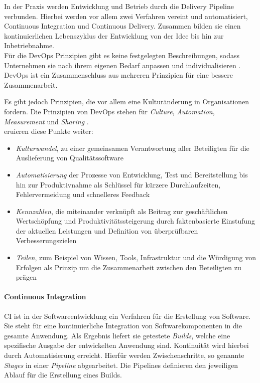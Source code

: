 In der Praxis werden Entwicklung und Betrieb durch die Delivery Pipeline verbunden.
Hierbei werden vor allem zwei Verfahren vereint und automatisiert, Continuous Integration und Continuous Delivery. Zusammen bilden sie einen kontinuierlichen Lebenszyklus der Entwicklung von der Idee bis hin zur Inbetriebnahme.
\medskip
\\
Für die DevOps Prinzipien gibt es keine festgelegten Beschreibungen, sodass Unternehmen sie nach ihrem eigenen Bedarf anpassen und individualisieren \cite{Alt2017}. DevOps ist ein Zusammenschluss aus mehreren Prinzipien für eine bessere Zusammenarbeit.

Es gibt jedoch Prinzipien, die vor allem eine Kulturänderung in Organisationen fordern. Die Prinzipien von DevOps stehen für \emph{Culture}, \emph{Automation}, \emph{Measurement} und \emph{Sharing} \cite{humble:2011}. 
\medskip
\\
\citet[S.26f]{Alt2017} eruieren diese Punkte weiter:
\begin{itemize}
    \item \emph{Kulturwandel}, zu einer gemeinsamen Verantwortung aller Beteiligten für die Auslieferung von Qualitätssoftware
    \item \emph{Automatisierung} der Prozesse von Entwicklung, Test und Bereitstellung bis hin zur Produktivnahme als Schlüssel für kürzere Durchlaufzeiten, Fehlervermeidung und schnelleres Feedback
    \item \emph{Kennzahlen}, die miteinander verknüpft als Beitrag zur geschäftlichen Wertschöpfung und Produktivitätssteigerung durch faktenbasierte Einstufung der aktuellen Leistungen und Definition von überprüfbaren Verbesserungszielen
    \item \emph{Teilen}, zum Beispiel von Wissen, Tools, Infrastruktur und die Würdigung von Erfolgen als Prinzip um die Zusammenarbeit zwischen den Beteiligten zu prägen
\end{itemize}

\paragraph{Continuous Integration}
\ac{CI} ist in der Softwareentwicklung ein Verfahren für die Erstellung von Software. Sie steht für eine kontinuierliche Integration von Softwarekomponenten in die gesamte Anwendung. Als Ergebnis liefert sie getestete \emph{Builds}, welche eine spezifische Ausgabe der entwickelten Anwendung sind. Kontinuität wird hierbei durch Automatisierung erreicht. Hierfür werden Zwischenschritte, so genannte \emph{Stages} in einer \emph{Pipeline} abgearbeitet. Die Pipelines definieren den jeweiligen Ablauf für die Erstellung eines Builds.

